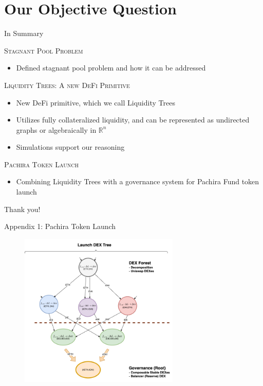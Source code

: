 \documentclass[10pt,xcolor=svgnames]{beamer} %
\begin{document}
\section{Our Objective Question}

\begin{frame}{In Summary}


\begin{exampleblock}{\textsc{Stagnant Pool Problem}}
\begin{itemize}
  \item Defined stagnant pool problem and how it can be addressed
\end{itemize}
\end{exampleblock}

\begin{exampleblock}{\textsc{Liquidity Trees: A new DeFi Primitive}}
\begin{itemize}
  \item New DeFi primitive, which we call Liquidity Trees 
  \item Utilizes fully collateralized liquidity, and can be represented as undirected graphs or algebraically in $\mathbb{R}^n$
  \item Simulations support our reasoning
\end{itemize}
\end{exampleblock}

\begin{exampleblock}{\textsc{Pachira Token Launch}}
\begin{itemize}
  \item Combining Liquidity Trees with a governance system for Pachira Fund token launch
\end{itemize}
\end{exampleblock}



\end{frame}


\begin{frame}[standout]
  Thank you! 
\end{frame}

\begin{frame}{Appendix 1: Pachira Token Launch}
\begin{figure}[h!]
\includegraphics[width=3in]{img/dex_forest_single_tree.png}
\label{fig:dex_forest}
\end{figure}
\end{frame}
\end{document}
